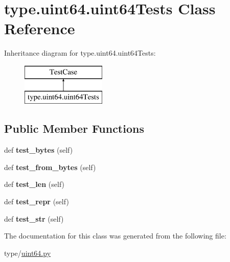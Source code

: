 \hypertarget{classtype_1_1uint64_1_1uint64Tests}{}\section{type.\+uint64.\+uint64\+Tests Class Reference}
\label{classtype_1_1uint64_1_1uint64Tests}
Inheritance diagram for type.\+uint64.\+uint64\+Tests\+:\begin{figure}[H]
\begin{center}
\leavevmode
\includegraphics[height=2.000000cm]{classtype_1_1uint64_1_1uint64Tests}
\end{center}
\end{figure}
\subsection*{Public Member Functions}
\begin{DoxyCompactItemize}
\item 
\mbox{\label{classtype_1_1uint64_1_1uint64Tests_a1831dda73572e9a6ff3898be6ce2c3a7}} 
def {\bfseries test\+\_\+bytes} (self)
\item 
\mbox{\label{classtype_1_1uint64_1_1uint64Tests_a8145e1176a839d5ba80985cd11c48437}} 
def {\bfseries test\+\_\+from\+\_\+bytes} (self)
\item 
\mbox{\label{classtype_1_1uint64_1_1uint64Tests_acc0ef39534e2ccdb0b769a8b72846fec}} 
def {\bfseries test\+\_\+len} (self)
\item 
\mbox{\label{classtype_1_1uint64_1_1uint64Tests_a5492f17807f5285f71da4ecf2545cd0f}} 
def {\bfseries test\+\_\+repr} (self)
\item 
\mbox{\label{classtype_1_1uint64_1_1uint64Tests_a87e57f2e6491a02a1b17b366df5b390a}} 
def {\bfseries test\+\_\+str} (self)
\end{DoxyCompactItemize}


The documentation for this class was generated from the following file\+:\begin{DoxyCompactItemize}
\item 
type/\mbox{\hyperlink{uint64_8py}{uint64.\+py}}\end{DoxyCompactItemize}
